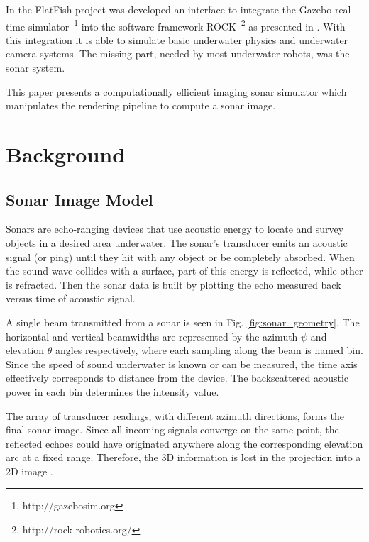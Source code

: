 \documentclass[final,5p,times]{elsarticle}
\begin{document}
In the FlatFish project \cite{albiez2015} was developed an interface to integrate the Gazebo real-time simulator~\footnote{http://gazebosim.org} into the software framework ROCK~\footnote{http://rock-robotics.org/} as presented in \cite{watanabe2015}. With this integration it is able to simulate basic underwater physics and underwater camera systems. The missing part, needed by most underwater robots, was the sonar system.

This paper presents a computationally efficient imaging sonar simulator which manipulates the rendering pipeline to compute a sonar image.


\section{Background}
\label{background}

\subsection{Sonar Image Model}
\label{sonar:model}

Sonars are echo-ranging devices that use acoustic energy to locate and survey objects in a desired area underwater. The sonar's transducer emits an acoustic signal (or ping) until they hit with any object or be completely absorbed. When the sound wave collides with a surface, part of this energy is reflected, while other is refracted. Then the sonar data is built by plotting the echo measured back versus time of acoustic signal.

A single beam transmitted from a sonar is seen in Fig. \ref{fig:sonar_geometry}. The horizontal and vertical beamwidths are represented by the azimuth $\psi$ and elevation $\theta$ angles respectively, where each sampling along the beam is named bin. Since the speed of sound underwater is known or can be measured, the time axis effectively corresponds to distance from the device. The backscattered acoustic power in each bin determines the intensity value.

The array of transducer readings, with different azimuth directions, forms the final sonar image. Since all incoming signals converge on the same point, the reflected echoes could have originated anywhere along the corresponding elevation arc at a fixed range. Therefore, the 3D information is lost in the projection into a 2D image \cite{huang2015}.
\end{document}
